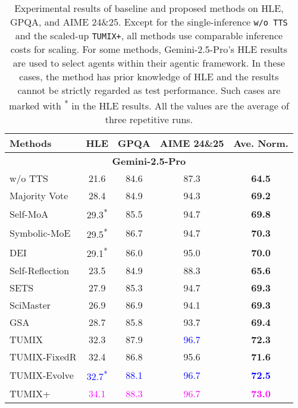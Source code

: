 \begin{table*}[ht]
\caption{Experimental results of baseline and proposed methods on HLE, GPQA, and AIME 24\&25. Except for the single-inference \texttt{w/o TTS} and the scaled-up \texttt{TUMIX+}, all methods use comparable inference costs for scaling. For some methods, Gemini-2.5-Pro's HLE results are used to select agents within their agentic framework. In these cases, the method has prior knowledge of HLE and the results cannot be strictly regarded as test performance. Such cases are marked with \textsuperscript{*} in the HLE results. All the values are the average of three repetitive runs.}
\label{table: overall results}
\vskip 0.15in
\centering
\begin{small}
\begin{sc}
\begin{tabular}{lcccc}
\toprule
\textbf{Methods} & \textbf{HLE} & \textbf{GPQA} & \textbf{AIME 24\&25} & \textbf{Ave. Norm.} \\
\midrule
\multicolumn{5}{c}{\textbf{Gemini-2.5-Pro}}\\
w/o TTS & 21.6 & 84.6 & 87.3 & \textbf{64.5} \\
Majority Vote & 28.4 & 84.9 & 94.3 & \textbf{69.2} \\
Self-MoA & 29.3\textsuperscript{*} & 85.5 & 94.7 & \textbf{69.8} \\
Symbolic-MoE & 29.5\textsuperscript{*} & 86.7 & 94.7 & \textbf{70.3} \\
DEI & 29.1\textsuperscript{*} & 86.0 & 95.0 & \textbf{70.0} \\
Self-Reflection & 23.5 & 84.9 & 88.3 & \textbf{65.6} \\
SETS & 27.9 & 85.3 & 94.7 & \textbf{69.3} \\
SciMaster & 26.9 & 86.9 & 94.1 & \textbf{69.3} \\
GSA & 28.7 & 85.8 & 93.7 & \textbf{69.4} \\
\rowcolor{LightCyan} TUMIX & 32.3 & 87.9 & \textcolor{blue}{96.7} & \textbf{72.3} \\
\rowcolor{LightCyan} TUMIX-FixedR & 32.4 & 86.8 & 95.6 & \textbf{71.6} \\
\rowcolor{LightCyan} TUMIX-Evolve & \textcolor{blue}{32.7\textsuperscript{*}} & \textcolor{blue}{88.1} & \textcolor{blue}{96.7} & \textcolor{blue}{\textbf{72.5}} \\
\rowcolor{softlavender} TUMIX+ & \textcolor{magenta}{34.1} & \textcolor{magenta}{88.3} & \textcolor{magenta}{96.7} & \textcolor{magenta}{\textbf{73.0}} \\

\end{tabular}
\end{sc}
\end{small}
\end{table*}

